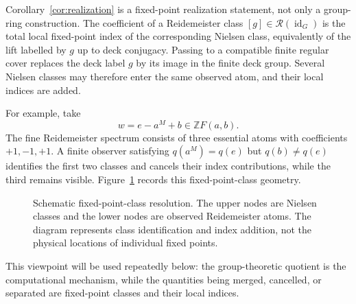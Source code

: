 \documentclass[11pt]{article}
\DeclareMathOperator{\id}{id}
\newcommand{\RN}{\mathcal R}
\newcommand{\Z}{\mathbb Z}
\begin{document}
Corollary~\ref{cor:realization} is a fixed-point realization statement, not only
a group-ring construction.  The coefficient of a Reidemeister class
$[g]\in\RN(\id_G)$ is the total local fixed-point index of the corresponding
Nielsen class, equivalently of the lift labelled by $g$ up to deck
conjugacy.  Passing to a compatible finite regular cover replaces the deck
label $g$ by its image in the finite deck group.  Several Nielsen classes may
therefore enter the same observed atom, and their local indices are added.

For example, take
\[
  w=e-a^{M}+b\in\Z F(a,b).
\]
The fine Reidemeister spectrum consists of three essential atoms with
coefficients $+1,-1,+1$.  A finite observer satisfying
$q(a^M)=q(e)$ but $q(b)\ne q(e)$ identifies the first two classes and cancels
their index contributions, while the third remains visible.  Figure~\ref{fig:collision-cancellation} records this fixed-point-class geometry.

\begin{figure}[t]
\centering
{}
\caption{Schematic fixed-point-class resolution.  The upper nodes are Nielsen
classes and the lower nodes are observed Reidemeister atoms.  The diagram
represents class identification and index addition, not the physical
locations of individual fixed points.}
\label{fig:collision-cancellation}
\end{figure}

This viewpoint will be used repeatedly below: the group-theoretic quotient is
the computational mechanism, while the quantities being merged, cancelled,
or separated are fixed-point classes and their local indices.
\end{document}
